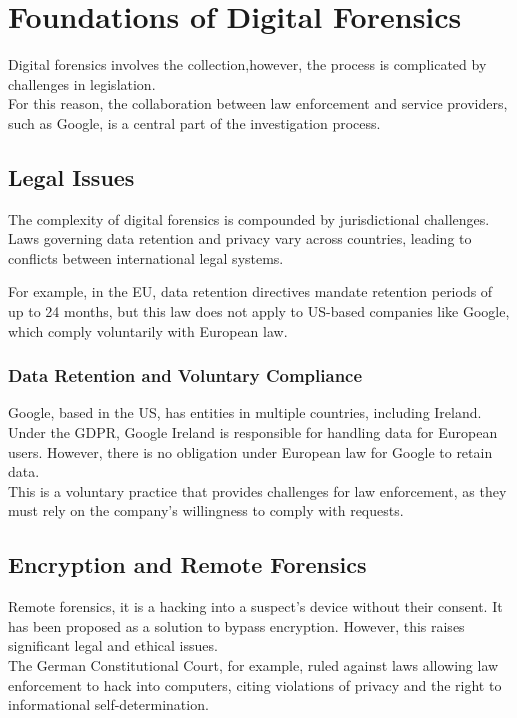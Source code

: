 \section{Foundations of Digital Forensics}

Digital forensics involves the collection,however, the process is complicated by challenges in legislation.\\
For this reason, the collaboration between law enforcement and service providers, such as Google, is a central part of the investigation process.


\subsection{Legal Issues}
The complexity of digital forensics is compounded by jurisdictional challenges. \\
Laws governing data retention and privacy vary across countries, leading to conflicts between international legal systems.
\smallskip

\noindent
For example, in the EU, data retention directives mandate retention periods of up to 24 months, but this law does not apply to US-based companies like Google, which comply voluntarily with European law.

\subsubsection*{Data Retention and Voluntary Compliance}
Google, based in the US, has entities in multiple countries, including Ireland. Under the GDPR, Google Ireland is responsible for handling data for European users. However, there is no obligation under European law for Google to retain data. \\
This is a voluntary practice that provides challenges for law enforcement, as they must rely on the company's willingness to comply with requests.

\subsection{Encryption and Remote Forensics}

Remote forensics, it is a hacking into a suspect's device without their consent. It has been proposed as a solution to bypass encryption. However, this raises significant legal and ethical issues.\\
The German Constitutional Court, for example, ruled against laws allowing law enforcement to hack into computers, citing violations of privacy and the right to informational self-determination.
\medskip

